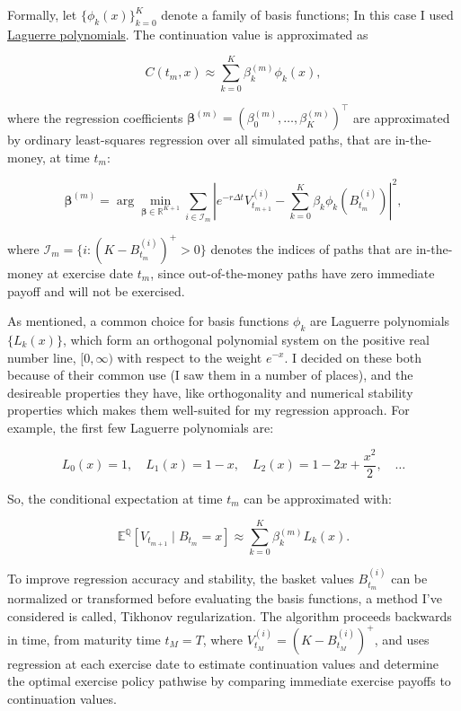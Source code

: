 \documentclass[titlepage]{article}
\begin{document}
Formally, let \(\{ \phi_k(x) \}_{k=0}^K\) denote a family of basis functions; In this case I used \href{sec:Laguerre}{Laguerre polynomials}. The continuation value is approximated as

\begin{equation}
C(t_m, x) \approx \sum_{k=0}^K \beta_k^{(m)} \phi_k(x),
\label{eq:continuation_approx}
\end{equation}

where the regression coefficients \(\boldsymbol{\beta}^{(m)} = (\beta_0^{(m)}, \ldots, \beta_K^{(m)})^\top\) are approximated by ordinary least-squares regression over all simulated paths, that are in-the-money, at time \(t_m\):

\begin{equation}
\boldsymbol{\beta}^{(m)} = \arg\min_{\boldsymbol{\beta} \in \mathbb{R}^{K+1}} \sum_{i \in \mathcal{I}_m} \left| e^{-r \Delta t} V_{t_{m+1}}^{(i)} - \sum_{k=0}^K \beta_k \phi_k(B_{t_m}^{(i)}) \right|^2,
\label{eq:regression_objective}
\end{equation}

where \(\mathcal{I}_m = \{i : (K - B_{t_m}^{(i)})^+ > 0\}\) denotes the indices of paths that are in-the-money at exercise date \(t_m\), since out-of-the-money paths have zero immediate payoff and will not be exercised.

As mentioned, a common choice for basis functions \(\phi_k\) are Laguerre polynomials \(\{L_k(x)\}\), which form an orthogonal polynomial system on the positive real number line, \([0, \infty)\) with respect to the weight \(e^{-x}\). I decided on these both because of their common use (I saw them in a number of places), and the desireable properties they have, like orthogonality and numerical stability properties which makes them well-suited for my regression approach. For example, the first few Laguerre polynomials are:

\[
L_0(x) = 1, \quad L_1(x) = 1 - x, \quad L_2(x) = 1 - 2x + \frac{x^2}{2}, \quad \ldots
\]

So, the conditional expectation at time \(t_m\) can be approximated with:

\begin{equation}
\mathbb{E}^{\mathbb{Q}}\left[ V_{t_{m+1}} \mid B_{t_m} = x \right] \approx \sum_{k=0}^K \beta_k^{(m)} L_k(x).
\label{eq:laguerre_regression}
\end{equation}

To improve regression accuracy and stability, the basket values \(B_{t_m}^{(i)}\) can be normalized or transformed before evaluating the basis functions, a method I've considered is called, Tikhonov regularization. The algorithm proceeds backwards in time, from maturity time \(t_M = T\), where \(V_{t_M}^{(i)} = (K - B_{t_M}^{(i)})^+\), and uses regression at each exercise date to estimate continuation values and determine the optimal exercise policy pathwise by comparing immediate exercise payoffs to continuation values.
\end{document}
